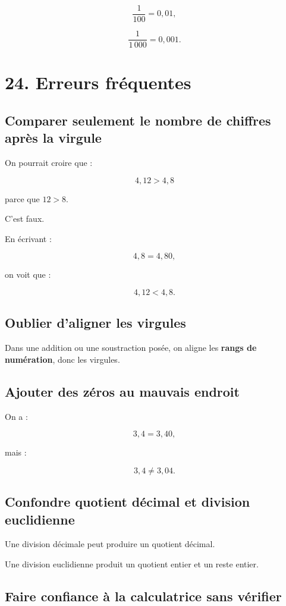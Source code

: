\[
\dfrac{1}{100}=0{,}01,
\]

\[
\dfrac{1}{1\,000}=0{,}001.
\]

\section{24. Erreurs fréquentes}

\subsection{Comparer seulement le nombre de chiffres après la virgule}

On pourrait croire que :

\[
4{,}12>4{,}8
\]

parce que $12>8$.

C’est faux.

En écrivant :

\[
4{,}8=4{,}80,
\]

on voit que :

\[
\boxed{4{,}12<4{,}8}.
\]

\subsection{Oublier d’aligner les virgules}

Dans une addition ou une soustraction posée, on aligne les \textbf{rangs de numération}, donc les virgules.

\subsection{Ajouter des zéros au mauvais endroit}

On a :

\[
3{,}4=3{,}40,
\]

mais :

\[
3{,}4\neq3{,}04.
\]

\subsection{Confondre quotient décimal et division euclidienne}

Une division décimale peut produire un quotient décimal.

Une division euclidienne produit un quotient entier et un reste entier.

\subsection{Faire confiance à la calculatrice sans vérifier}

